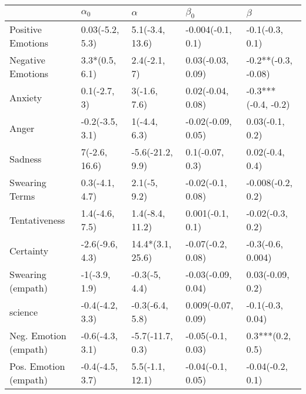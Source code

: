 \begin{tabular}{lllll}
\toprule
{} &       $\alpha_0$ &          $\alpha$ &           $\beta_0$ &              $\beta$ \\
\midrule
Positive Emotions     &  0.03(-5.2, 5.3) &   5.1(-3.4, 13.6) &   -0.004(-0.1, 0.1) &      -0.1(-0.3, 0.1) \\
Negative Emotions     &   3.3*(0.5, 6.1) &      2.4(-2.1, 7) &   0.03(-0.03, 0.09) &  -0.2**(-0.3, -0.08) \\
Anxiety               &     0.1(-2.7, 3) &      3(-1.6, 7.6) &   0.02(-0.04, 0.08) &  -0.3***(-0.4, -0.2) \\
Anger                 &  -0.2(-3.5, 3.1) &      1(-4.4, 6.3) &  -0.02(-0.09, 0.05) &      0.03(-0.1, 0.2) \\
Sadness               &    7(-2.6, 16.6) &  -5.6(-21.2, 9.9) &     0.1(-0.07, 0.3) &      0.02(-0.4, 0.4) \\
Swearing Terms        &   0.3(-4.1, 4.7) &      2.1(-5, 9.2) &   -0.02(-0.1, 0.08) &    -0.008(-0.2, 0.2) \\
Tentativeness         &   1.4(-4.6, 7.5) &   1.4(-8.4, 11.2) &    0.001(-0.1, 0.1) &     -0.02(-0.3, 0.2) \\
Certainty             &  -2.6(-9.6, 4.3) &  14.4*(3.1, 25.6) &   -0.07(-0.2, 0.08) &    -0.3(-0.6, 0.004) \\
Swearing (empath)     &    -1(-3.9, 1.9) &     -0.3(-5, 4.4) &  -0.03(-0.09, 0.04) &     0.03(-0.09, 0.2) \\
science               &  -0.4(-4.2, 3.3) &   -0.3(-6.4, 5.8) &  0.009(-0.07, 0.09) &     -0.1(-0.3, 0.04) \\
Neg. Emotion (empath) &  -0.6(-4.3, 3.1) &  -5.7(-11.7, 0.3) &   -0.05(-0.1, 0.03) &     0.3***(0.2, 0.5) \\
Pos. Emotion (empath) &  -0.4(-4.5, 3.7) &   5.5(-1.1, 12.1) &   -0.04(-0.1, 0.05) &     -0.04(-0.2, 0.1) \\
\bottomrule
\end{tabular}
